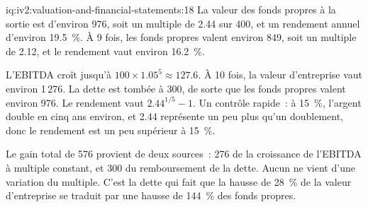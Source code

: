 \begin{solution}{iq:iv2:valuation-and-financial-statements:18}
La valeur des fonds propres à la sortie est d'environ 976, soit un multiple de 2.44 sur 400, et un rendement annuel d'environ 19.5~\%. À 9 fois, les fonds propres valent environ 849, soit un multiple de 2.12, et le rendement vaut environ 16.2~\%.

L'EBITDA croît jusqu'à $100 \times 1.05^5 \approx 127.6$. À 10 fois, la valeur d'entreprise vaut environ 1\,276. La dette est tombée à 300, de sorte que les fonds propres valent environ 976. Le rendement vaut $2.44^{1/5} - 1$. Un contrôle rapide~: à 15~\%, l'argent double en cinq ans environ, et 2.44 représente un peu plus qu'un doublement, donc le rendement est un peu supérieur à 15~\%.

Le gain total de 576 provient de deux sources~: 276 de la croissance de l'EBITDA à multiple constant, et 300 du remboursement de la dette. Aucun ne vient d'une variation du multiple. C'est la dette qui fait que la hausse de 28~\% de la valeur d'entreprise se traduit par une hausse de 144~\% des fonds propres.

\end{solution}

